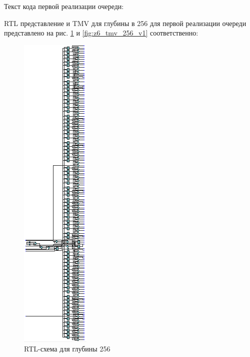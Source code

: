 \documentclass[a4paper,14pt]{article}
\begin{document}
	Текст кода первой реализации очереди:
	
	
	RTL представление и TMV для глубины в 256 для первой реализации очереди представлено на рис.  \ref{fig:z6_rtl_256_v1} и  \ref{fig:z6_tmv_256_v1} соответственно:
	
	\begin{figure}[H]
		\centering
		\includegraphics[width=0.8\linewidth]{images/z6_rtl_256_v1}
		\caption{RTL-схема для глубины 256}
		\label{fig:z6_rtl_256_v1}
	\end{figure}
\end{document}
